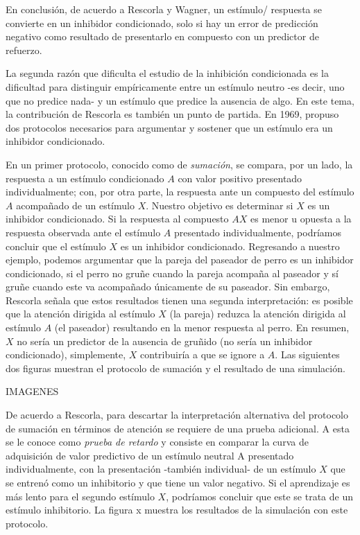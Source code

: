 \documentclass[
  letterpaper,
]{book}
\begin{document}
En conclusión, de acuerdo a Rescorla y Wagner, un estímulo/ respuesta se
convierte en un inhibidor condicionado, solo si hay un error de
predicción negativo como resultado de presentarlo en compuesto con un
predictor de refuerzo.

La segunda razón que dificulta el estudio de la inhibición condicionada
es la dificultad para distinguir empíricamente entre un estímulo neutro
-es decir, uno que no predice nada- y un estímulo que predice la
ausencia de algo. En este tema, la contribución de Rescorla es también
un punto de partida. En 1969, propuso dos protocolos necesarios para
argumentar y sostener que un estímulo era un inhibidor condicionado.

En un primer protocolo, conocido como de \emph{sumación}, se compara,
por un lado, la respuesta a un estímulo condicionado \(A\) con valor
positivo presentado individualmente; con, por otra parte, la respuesta
ante un compuesto del estímulo \(A\) acompañado de un estímulo \(X\).
Nuestro objetivo es determinar si \(X\) es un inhibidor condicionado. Si
la respuesta al compuesto \(AX\) es menor u opuesta a la respuesta
observada ante el estímulo \(A\) presentado individualmente, podríamos
concluir que el estímulo \(X\) es un inhibidor condicionado. Regresando
a nuestro ejemplo, podemos argumentar que la pareja del paseador de
perro es un inhibidor condicionado, si el perro no gruñe cuando la
pareja acompaña al paseador y sí gruñe cuando este va acompañado
únicamente de su paseador. Sin embargo, Rescorla señala que estos
resultados tienen una segunda interpretación: es posible que la atención
dirigida al estímulo \(X\) (la pareja) reduzca la atención dirigida al
estímulo \(A\) (el paseador) resultando en la menor respuesta al perro.
En resumen, \(X\) no sería un predictor de la ausencia de gruñido (no
sería un inhibidor condicionado), simplemente, \(X\) contribuiría a que
se ignore a \(A\). Las siguientes dos figuras muestran el protocolo de
sumación y el resultado de una simulación.

IMAGENES

De acuerdo a Rescorla, para descartar la interpretación alternativa del
protocolo de sumación en términos de atención se requiere de una prueba
adicional. A esta se le conoce como \emph{prueba de retardo} y consiste
en comparar la curva de adquisición de valor predictivo de un estímulo
neutral A presentado individualmente, con la presentación -también
individual- de un estímulo \(X\) que se entrenó como un inhibitorio y
que tiene un valor negativo. Si el aprendizaje es más lento para el
segundo estímulo \(X\), podríamos concluir que este se trata de un
estímulo inhibitorio. La figura x muestra los resultados de la
simulación con este protocolo.
\end{document}
